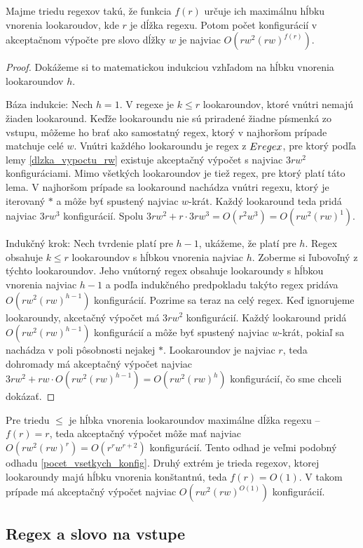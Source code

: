 \begin{lema}\label{lema_hlbka_lookaroundov}
Majme triedu regexov takú, že funkcia $f(r)$ určuje ich maximálnu hĺbku vnorenia lookaroudov, kde $r$ je dĺžka regexu. Potom počet konfigurácií v akceptačnom výpočte pre slovo dĺžky $w$ je najviac $O(rw^2(rw)^{f(r)})$.
\end{lema}
\begin{proof}
Dokážeme si to matematickou indukciou vzhľadom na hĺbku vnorenia lookaroundov $h$.

Báza indukcie: Nech $h=1$. V regexe je $k\leq r$ lookaroundov, ktoré vnútri nemajú žiaden lookaround. Keďže lookaroundu nie sú priradené žiadne písmenká zo vstupu, môžeme ho brať ako samostatný regex, ktorý v najhoršom prípade matchuje celé $w$. Vnútri každého lookaroundu je regex z $Eregex$, pre ktorý podľa lemy \ref{dlzka_vypoctu_rw} existuje akceptačný výpočet s najviac $3rw^2$ konfiguráciami. Mimo všetkých lookaroundov je tiež regex, pre ktorý platí táto lema. V najhoršom prípade sa lookaround nachádza vnútri regexu, ktorý je iterovaný $*$ a môže byť spustený najviac $w$-krát. Každý lookaround teda pridá najviac $3rw^3$ konfigurácií. Spolu $3rw^2+r\cdot 3rw^3 = O(r^2w^3) = O(rw^2(rw)^1)$. 

Indukčný krok: Nech tvrdenie platí pre $h-1$, ukážeme, že platí pre $h$. Regex obsahuje $k\leq r$ lookaroundov s hĺbkou vnorenia najviac $h$. Zoberme si ľubovoľný z týchto lookaroundov. Jeho vnútorný regex obsahuje lookaroundy s hĺbkou vnorenia najviac $h-1$ a podľa indukčného predpokladu takýto regex pridáva $O(rw^2(rw)^{h-1})$ konfigurácií. Pozrime sa teraz na celý regex. Keď ignorujeme lookaroundy, akcetačný výpočet má $3rw^2$ konfigurácií. Každý lookaround pridá $O(rw^2(rw)^{h-1})$ konfigurácií a môže byť spustený najviac $w$-krát, pokiaľ sa nachádza v poli pôsobnosti nejakej $*$. Lookaroundov je najviac $r$, teda dohromady má akceptačný výpočet najviac $3rw^2+rw\cdot O(rw^2(rw)^{h-1}) = O(rw^2(rw)^h)$ konfigurácií, čo sme chceli dokázať.
\end{proof}

Pre triedu $\le$ je hĺbka vnorenia lookaroundov maximálne dĺžka regexu -- $f(r)=r$, teda akceptačný výpočet môže mať najviac $O(rw^2(rw)^r) = O(r^rw^{r+2})$ konfigurácií. Tento odhad je veľmi podobný odhadu \ref{pocet_vsetkych_konfig}. Druhý extrém je trieda regexov, ktorej lookaroundy majú hĺbku vnorenia konštantnú, teda $f(r)=O(1)$. V takom prípade má akceptačný výpočet najviac $O(rw^2(rw)^{O(1)})$ konfigurácií.

\subsection{Regex a slovo na vstupe}

